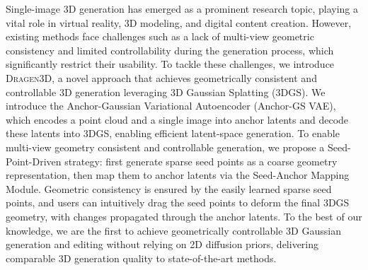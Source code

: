 
Single-image 3D generation has emerged as a prominent research topic, playing a vital role in virtual reality, 3D modeling, and digital content creation. However, existing methods face challenges such as a lack of multi-view geometric consistency and limited controllability during the generation process, which significantly restrict their usability.
%
To tackle these challenges, we introduce \textsc{Dragen3D}, a novel approach that achieves geometrically consistent and controllable 3D generation leveraging 3D Gaussian Splatting (3DGS).
%
We introduce the Anchor-Gaussian Variational Autoencoder (Anchor-GS VAE), which encodes a point cloud and a single image into anchor latents and decode these latents into 3DGS, enabling efficient latent-space generation.
%
To enable multi-view geometry consistent and controllable generation, we propose a Seed-Point-Driven strategy: first generate sparse seed points as a coarse geometry representation, then map them to anchor latents via the Seed-Anchor Mapping Module. Geometric consistency is ensured by the easily learned sparse seed points, and users can intuitively drag the seed points to deform the final 3DGS geometry, with changes propagated through the anchor latents.
%
To the best of our knowledge, we are the first to achieve geometrically controllable 3D Gaussian generation and editing without relying on 2D diffusion priors, delivering comparable 3D generation quality to state-of-the-art methods.
